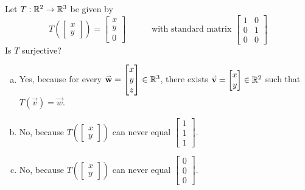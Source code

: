 \begin{activity}{3}
Let \(T: \mathbb{R}^2 \rightarrow \mathbb{R}^3\) be given by
\[
  T\left(\begin{bmatrix}x \\ y \end{bmatrix} \right)
    =
  \begin{bmatrix} x \\ y \\ 0 \end{bmatrix}
    \hspace{3em}
    \text{with standard matrix }
  \begin{bmatrix} 1 & 0 \\ 0 & 1 \\ 0 & 0 \end{bmatrix}
\]
Is \(T\) surjective?
\begin{enumerate}[a)]
\item Yes, because for every \(\mathbf{\accentset{\rightharpoonup}{w}}=\begin{bmatrix}x\\y\\z\end{bmatrix}\in\mathbb{R}^3\),
there exists \(\mathbf{\accentset{\rightharpoonup}{v}}=\begin{bmatrix}x\\y\end{bmatrix}\in\mathbb{R}^2\) such that
\(T(\vec v)=\vec w\).
\item No, because 
  \(
    T\left(\begin{bmatrix}x\\y\end{bmatrix}\right)
  \)
can never equal
  \(
  \begin{bmatrix} 1 \\ 1 \\ 1 \end{bmatrix}
  \).
\item No, because 
  \(
    T\left(\begin{bmatrix}x\\y\end{bmatrix}\right)
  \)
can never equal
  \(
  \begin{bmatrix} 0 \\ 0 \\ 0 \end{bmatrix}
  \).
\end{enumerate}
\end{activity}

